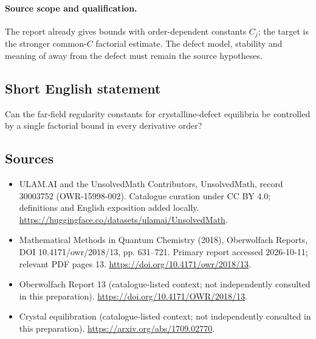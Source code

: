 \documentclass[11pt]{article}
\begin{document}
\paragraph{Source scope and qualification.}
The report already gives bounds with order-dependent constants $C_j$; the target is the stronger common-$C$ factorial estimate. The defect model, stability and meaning of away from the defect must remain the source hypotheses.
\subsection{Short English statement}
Can the far-field regularity constants for crystalline-defect equilibria be controlled by a single factorial bound in every derivative order?
\subsection{Sources}
\begin{itemize}
\item[\hypertarget{source:30003752:1}{S1}] ULAM.AI and the UnsolvedMath Contributors, UnsolvedMath, record 30003752 (OWR-15998-002). Catalogue curation under CC BY 4.0; definitions and English exposition added locally.
\url{https://huggingface.co/datasets/ulamai/UnsolvedMath}.
\item[\hypertarget{source:30003752:2}{S2}] Mathematical Methods in Quantum Chemistry (2018), Oberwolfach Reports, DOI 10.4171/owr/2018/13, pp. 631--721. Primary report accessed 2026-10-11; relevant PDF pages 13.
\url{https://doi.org/10.4171/owr/2018/13}.
\item[\hypertarget{source:30003752:3}{S3}] Oberwolfach Report 13 (catalogue-listed context; not independently consulted in this preparation).
\url{https://doi.org/10.4171/OWR/2018/13}.
\item[\hypertarget{source:30003752:4}{S4}] Crystal equilibration (catalogue-listed context; not independently consulted in this preparation).
\url{https://arxiv.org/abs/1709.02770}.
\end{itemize}
\label{end:30003752}
\end{document}
